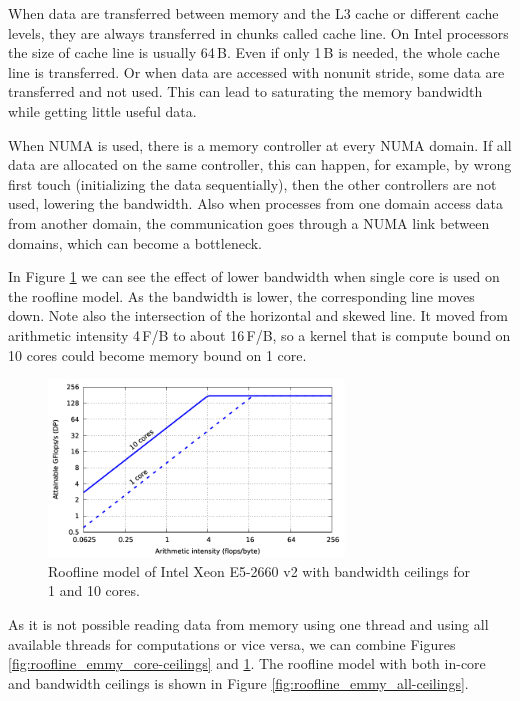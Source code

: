 When data are transferred between memory and the L3 cache or different cache levels, they are always transferred in chunks called cache line. On Intel processors the size of cache line is usually 64\,B. Even if only 1\,B is needed, the whole cache line is transferred. Or when data are accessed with nonunit stride, some data are transferred and not used. This can lead to saturating the memory bandwidth while getting little useful data.

When NUMA is used, there is a memory controller at every NUMA domain. If all data are allocated on the same controller, this can happen, for example, by wrong first touch (initializing the data sequentially), then the other controllers are not used, lowering the bandwidth. Also when processes from one domain access data from another domain, the communication goes through a NUMA link between domains, which can become a bottleneck.

In Figure \ref{fig:roofline_emmy_memory-ceilings} we can see the effect of lower bandwidth when single core is used on the roofline model. As the bandwidth is lower, the corresponding line moves down. Note also the intersection of the horizontal and skewed line. It moved from arithmetic intensity 4\,F/B to about 16\,F/B, so a kernel that is compute bound on 10 cores could become memory bound on 1 core.

\begin{figure}[ht]
   \centering
   \includegraphics[width=0.7\textwidth,clip=true]{images/roofline/roofline_emmy_Xeon2660v2_memory-ceilings.pdf}
   \caption{Roofline model of Intel Xeon E5-2660 v2 with bandwidth ceilings for 1 and 10 cores.}
  \label{fig:roofline_emmy_memory-ceilings}
\end{figure}

As it is not possible reading data from memory using one thread and using all available threads for computations or vice versa, we can combine Figures \ref{fig:roofline_emmy_core-ceilings} and \ref{fig:roofline_emmy_memory-ceilings}. The roofline model with both in-core and bandwidth ceilings is shown in Figure \ref{fig:roofline_emmy_all-ceilings}.

